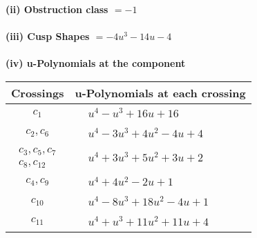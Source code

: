 \documentclass[1p]{elsarticle_modified}
\theoremstyle{definition}
\begin{document}
\flushleft \textbf{(ii) Obstruction class $= -1$}\\~\\
\flushleft \textbf{(iii) Cusp Shapes $= -4 u^3-14 u-4$}\\~\\
\newpage\renewcommand{\arraystretch}{1}
\flushleft \textbf{(iv) u-Polynomials at the component}\newline \\
\begin{tabular}{m{50pt}|m{274pt}}
Crossings & \hspace{64pt}u-Polynomials at each crossing \\
\hline $$\begin{aligned}c_{1}\end{aligned}$$&$\begin{aligned}
&u^4- u^3+16 u+16
\end{aligned}$\\
\hline $$\begin{aligned}c_{2},c_{6}\end{aligned}$$&$\begin{aligned}
&u^4-3 u^3+4 u^2-4 u+4
\end{aligned}$\\
\hline $$\begin{aligned}c_{3},c_{5},c_{7}\\c_{8},c_{12}\end{aligned}$$&$\begin{aligned}
&u^4+3 u^3+5 u^2+3 u+2
\end{aligned}$\\
\hline $$\begin{aligned}c_{4},c_{9}\end{aligned}$$&$\begin{aligned}
&u^4+4 u^2-2 u+1
\end{aligned}$\\
\hline $$\begin{aligned}c_{10}\end{aligned}$$&$\begin{aligned}
&u^4-8 u^3+18 u^2-4 u+1
\end{aligned}$\\
\hline $$\begin{aligned}c_{11}\end{aligned}$$&$\begin{aligned}
&u^4+u^3+11 u^2+11 u+4
\end{aligned}$\\
\hline
\end{tabular}\\~\\
\end{document}
